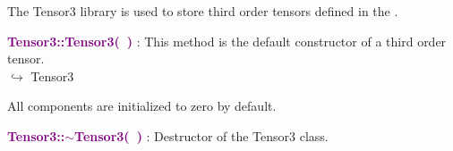 The Tensor3 library is used to store third order tensors defined in the \DynELA.

\textcolor{purple}{\textbf{Tensor3::Tensor3(~)}}\label{Tensor3::Tensor3()} : This method is the default constructor of a third order tensor.\\ \hspace*{5mm}$\hookrightarrow$ Tensor3

All components are initialized to zero by default.

\textcolor{purple}{\textbf{Tensor3::$\sim$Tensor3(~)}}\label{Tensor3::~Tensor3()} : Destructor of the Tensor3 class.

